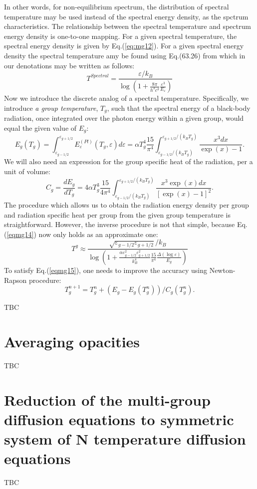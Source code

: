 In other words, for non-equilibrium spectrum, the distribution of spectral temperature may be used instead of the spectral energy density, as the spctrum characteristics.
The relationship between the spectral temperature and spectrum energy density is one-to-one mapping. For a given spectral temperature, the spectral energy density is given
by Eq.(\ref{eq:mg12}). For a given spectral energy density the spectral temperature amy be found using Eq.(63.26) from \cite{ll} which in our denotations may be written as 
follows:
\begin{equation}\label{eqmg14}
T^{Spectral}=\frac{\varepsilon/k_B}{\log\left(1+\frac{8\pi}{h^3c^3}\frac{\varepsilon^3}{E_\varepsilon}\right)}
\end{equation} 
Now we introduce the discrete analog of a spectral temperature. Specifically, we introduce {\it a group temperature}, $T_g$, such that the spectral energy of a black-body 
radiation, once integrated over the photon energy within a given group, would equal the given value of $E_g$:
\begin{equation}\label{eqmg15}
E_g(T_g)=\int_{\varepsilon_{g-1/2}}^{\varepsilon_{g+1/2}}{E_\varepsilon^{(Pl)}(T_g,\varepsilon)d\varepsilon}=\alpha T_g^4\frac{15}{\pi^4}\int_{\varepsilon_{g-1/2}/(k_BT_g)}^{\varepsilon_{g+1/2}/(k_BT_g)}{\frac{x^3dx}{\exp(x)-1}}.
\end{equation}
We will also need an expression for the group specific heat of the radiation, per a unit of volume:
\begin{equation}
C_g=\frac{dE_g}{dT_g}=4\alpha T_g^3\frac{15}{4\pi^4}\int_{\varepsilon_{g-1/2}/(k_BT_g)}^{\varepsilon_{g+1/2}/(k_BT_g)}{\frac{x^3\exp(x)dx}{[\exp(x)-1]^2}}.
\end{equation}
The procedure which allows us to obtain the radiation energy density per group and radiation specific heat per group from the given group temperature is 
straightforward. However, the inverse procedure is not that simple, because Eq.(\ref{eqmg14}) now only holds as an approximate one:
\begin{equation}\label{eq:mg16}
T^g\approx\frac{
\sqrt{\varepsilon_{g-1/2}\varepsilon_{g+1/2}}/k_B}
{
\log\left(
1+\frac{\alpha\varepsilon_{g-1/2}^2\varepsilon_{g+1/2}^2}{k_B^4}\frac{15}{\pi^4}\frac{\Delta(\log \varepsilon)}{E_g}\right)
}
\end{equation}
To satisfy Eq.(\ref{eqmg15}), one needs to improve the accuracy using Newton-Rapson procedure:
\begin{equation}
T_g^{n+1}=T_g^n+ (E_g-E_g(T_g^n))/C_g(T_g^n).
\end{equation} 

TBC
\section{Averaging opacities}
TBC
\section{Reduction of the multi-group diffusion equations to symmetric system of N temperature diffusion equations}
TBC

